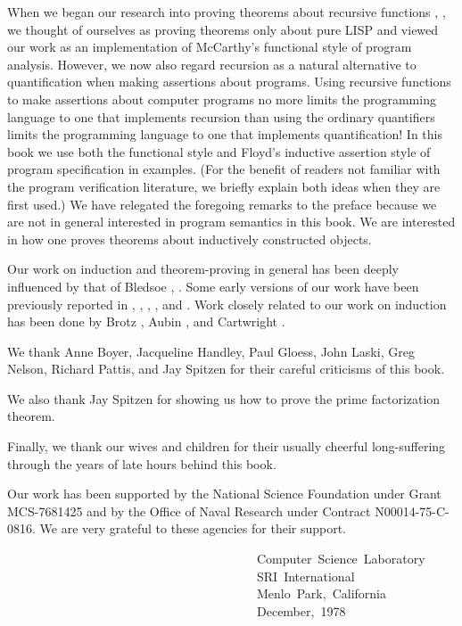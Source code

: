 \documentclass[10pt]{book}
\newenvironment{pubasis}{\begin{flushleft}}{\end{flushleft}}
\begin{document}
When
we began our research into
proving theorems about recursive functions \cite{JACM}, \cite{THESIS},
we thought of ourselves as proving theorems only about pure LISP
and viewed our work as an implementation of
McCarthy's \cite{MCCARTHYBASIS} functional style of program analysis.
However, we now also regard  recursion
as a   natural
alternative to quantification  when making assertions about programs.
Using recursive functions to make assertions about computer programs
no more limits the programming language to one
that implements recursion  than using the ordinary quantifiers
limits the programming language to one that implements quantification!
In this book we use both the functional style and Floyd's inductive
assertion style \cite{FLOYD}  of program specification in examples. (For the benefit of
readers not familiar with the program verification literature,
we briefly explain both ideas when they are first used.)
We have relegated the foregoing remarks to the preface because
we are not in general interested in program semantics in this book.
We are interested in how one proves theorems about inductively
constructed objects.

Our work on induction and theorem-proving in general  has been deeply influenced by
that of Bledsoe \cite{BLEDSOEPROVER}, \cite{BLEDSOELIMIT}.
Some early versions of our work have
been previously reported in \cite{JACM}, \cite{THESIS},
\cite{SIGART}, \cite{IEEE}, and
\cite{IJCAI77}.  Work closely related to
our work on induction has been done by
Brotz \cite{BROTZ}, Aubin \cite{AUBIN}, and Cartwright \cite{CARTWRIGHT}.

We thank Anne Boyer, Jacqueline Handley, Paul Gloess, John Laski, Greg Nelson, 
Richard Pattis, and Jay Spitzen for their
careful criticisms of this book.

We also thank Jay Spitzen for showing us how to prove the prime
factorization theorem.

Finally, we thank our wives and children for their usually cheerful
long-suffering through the years of late hours behind this book.

Our work has been supported by the National Science Foundation under
Grant MCS-7681425 and by the Office of Naval Research under Contract
N00014-75-C-0816.  We are very grateful to these agencies for their
support.
\begin{pubasis}
~~~~~~~~~~~~~~~~~~~~~~~~~~~~~~~~~~~~~~~~Computer~Science~Laboratory\\
~~~~~~~~~~~~~~~~~~~~~~~~~~~~~~~~~~~~~~~~SRI~International\\
~~~~~~~~~~~~~~~~~~~~~~~~~~~~~~~~~~~~~~~~Menlo~Park,~California\\
~~~~~~~~~~~~~~~~~~~~~~~~~~~~~~~~~~~~~~~~December,~1978\\
\end{pubasis}
\end{document}
